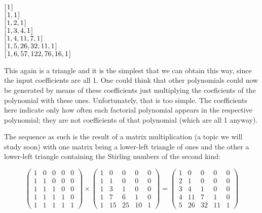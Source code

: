 \documentclass[tikz]{scrreprt}
\begin{document}
\begin{minipage}{\textwidth}
\begin{center}
\ensuremath{[\mskip1.5mu \mathrm{1}\mskip1.5mu]}\\
\ensuremath{[\mskip1.5mu \mathrm{1},\mathrm{1}\mskip1.5mu]}\\
\ensuremath{[\mskip1.5mu \mathrm{1},\mathrm{2},\mathrm{1}\mskip1.5mu]}\\
\ensuremath{[\mskip1.5mu \mathrm{1},\mathrm{3},\mathrm{4},\mathrm{1}\mskip1.5mu]}\\
\ensuremath{[\mskip1.5mu \mathrm{1},\mathrm{4},\mathrm{11},\mathrm{7},\mathrm{1}\mskip1.5mu]}\\
\ensuremath{[\mskip1.5mu \mathrm{1},\mathrm{5},\mathrm{26},\mathrm{32},\mathrm{11},\mathrm{1}\mskip1.5mu]}\\
\ensuremath{[\mskip1.5mu \mathrm{1},\mathrm{6},\mathrm{57},\mathrm{122},\mathrm{76},\mathrm{16},\mathrm{1}\mskip1.5mu]}
\end{center}
\end{minipage}

This again is a triangle and it is the simplest
that we can obtain this way, since the input
coefficients are all 1.
One could think that other polynomials could now
be generated by means of these coefficients
just multiplying the coeficients of the polynomial
with these ones.
Unfortunately, that is too simple.
The coefficients here indicate only
how often each factorial polynomial appears
in the respective polynomial;
they are not coefficients of that polynomial
(which are all 1 anyway).

The sequence as such is the result of a matrix
multiplication (a topic we will study soon) with
one matrix being a lower-left triangle of ones
and the other a lower-left triangle containing
the Stirling numbers of the second kind:

\begin{equation}
\begin{pmatrix}
1 & 0 & 0 & 0 & 0 \\
1 & 1 & 0 & 0 & 0 \\
1 & 1 & 1 & 0 & 0 \\
1 & 1 & 1 & 1 & 0 \\
1 & 1 & 1 & 1 & 1 
\end{pmatrix}
\times
\begin{pmatrix}
1 &  0 &  0 &  0 &  0 \\
1 &  1 &  0 &  0 &  0 \\
1 &  3 &  1 &  0 &  0 \\
1 &  7 &  6 &  1 &  0 \\
1 & 15 & 25 & 10 &  1 
\end{pmatrix}
=
\begin{pmatrix}
1 &  0 &  0 &  0 &  0 \\
2 &  1 &  0 &  0 &  0 \\
3 &  4 &  1 &  0 &  0 \\
4 & 11 &  7 &  1 &  0 \\
5 & 26 & 32 & 11 &  1 
\end{pmatrix}
\end{equation}
\end{document}
